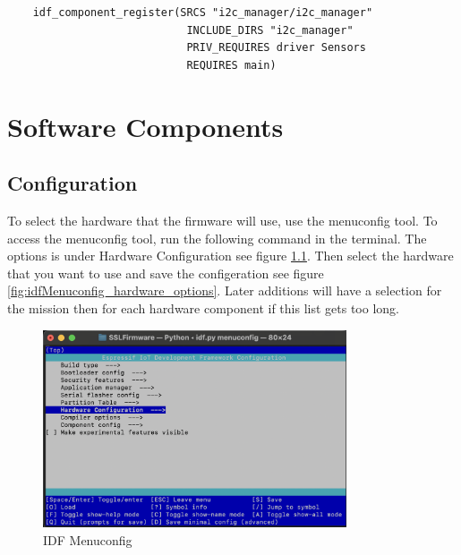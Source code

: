 \documentclass{book}
\begin{document}
\begin{verbatim}
    idf_component_register(SRCS "i2c_manager/i2c_manager" 
                            INCLUDE_DIRS "i2c_manager" 
                            PRIV_REQUIRES driver Sensors
                            REQUIRES main)
\end{verbatim}
\chapter{Software Components}
\section{Configuration}

\par To select the hardware that the firmware will use, use the menuconfig tool. To access the menuconfig tool, run the following command in the terminal. The options is under Hardware Configuration see figure \ref{fig:idfMenuconfig}. Then select the hardware that you want to use and save the configeration see figure \ref{fig:idfMenuconfig_hardware_options}. Later additions will have a selection for the mission then for each hardware component if this list gets too long.

\begin{center}
\noindent{}
\end{center}

\begin{figure} [H]
    \centering
    \includegraphics[width=0.8\textwidth]{images/idfMenuconfig.png}
    \caption{IDF Menuconfig}
    \label{fig:idfMenuconfig} 
\end{figure} 
\end{document}
